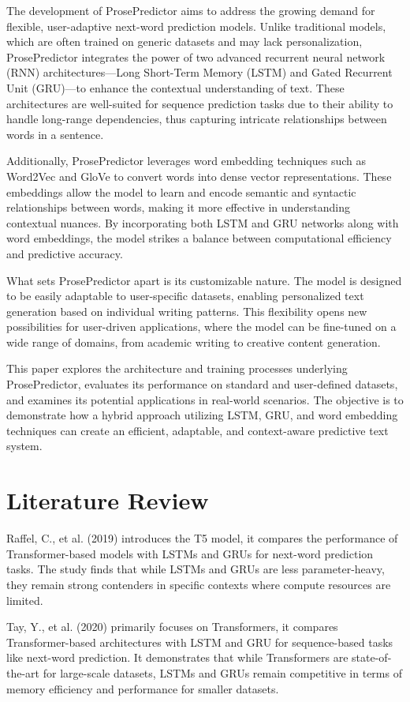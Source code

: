 \documentclass[conference]{IEEEtran}
\begin{document}
The development of ProsePredictor aims to address the growing demand for flexible, user-adaptive next-word prediction models. Unlike traditional models, which are often trained on generic datasets and may lack personalization, ProsePredictor integrates the power of two advanced recurrent neural network (RNN) architectures—Long Short-Term Memory (LSTM) and Gated Recurrent Unit (GRU)—to enhance the contextual understanding of text. These architectures are well-suited for sequence prediction tasks due to their ability to handle long-range dependencies, thus capturing intricate relationships between words in a sentence.

Additionally, ProsePredictor leverages word embedding techniques such as Word2Vec and GloVe to convert words into dense vector representations. These embeddings allow the model to learn and encode semantic and syntactic relationships between words, making it more effective in understanding contextual nuances. By incorporating both LSTM and GRU networks along with word embeddings, the model strikes a balance between computational efficiency and predictive accuracy.

What sets ProsePredictor apart is its customizable nature. The model is designed to be easily adaptable to user-specific datasets, enabling personalized text generation based on individual writing patterns. This flexibility opens new possibilities for user-driven applications, where the model can be fine-tuned on a wide range of domains, from academic writing to creative content generation.

This paper explores the architecture and training processes underlying ProsePredictor, evaluates its performance on standard and user-defined datasets, and examines its potential applications in real-world scenarios. The objective is to demonstrate how a hybrid approach utilizing LSTM, GRU, and word embedding techniques can create an efficient, adaptable, and context-aware predictive text system.


\section{Literature Review}Raffel, C., et al. (2019) introduces the T5 model, it compares the performance of Transformer-based models with LSTMs and GRUs for next-word prediction tasks. The study finds that while LSTMs and GRUs are less parameter-heavy, they remain strong contenders in specific contexts where compute resources are limited.

Tay, Y., et al. (2020) primarily focuses on Transformers, it compares Transformer-based architectures with LSTM and GRU for sequence-based tasks like next-word prediction. It demonstrates that while Transformers are state-of-the-art for large-scale datasets, LSTMs and GRUs remain competitive in terms of memory efficiency and performance for smaller datasets.
\end{document}
